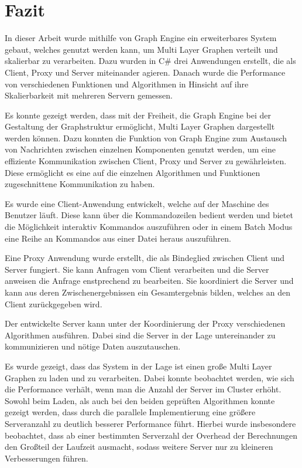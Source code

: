 \chapter{Fazit}

In dieser Arbeit wurde mithilfe von Graph Engine ein erweiterbares System gebaut, welches genutzt werden kann, um Multi Layer Graphen verteilt und skalierbar zu verarbeiten.
Dazu wurden in C\# drei Anwendungen erstellt, die als Client, Proxy und Server miteinander agieren.
Danach wurde die Performance von verschiedenen Funktionen und Algorithmen in Hinsicht auf ihre Skalierbarkeit mit mehreren Servern gemessen.


Es konnte gezeigt werden, dass mit der Freiheit, die Graph Engine bei der Gestaltung der Graphstruktur ermöglicht, Multi Layer Graphen dargestellt werden können.
Dazu konnten die Funktion von Graph Engine zum Austausch von Nachrichten zwischen einzelnen Komponenten genutzt werden, um eine effiziente Kommunikation zwischen Client, Proxy und Server zu gewährleisten. 
Diese ermöglicht es eine auf die einzelnen Algorithmen und Funktionen zugeschnittene Kommunikation zu haben.


Es wurde eine Client-Anwendung entwickelt, welche auf der Maschine des Benutzer läuft. Diese kann über die Kommandozeilen bedient werden und bietet die Möglichkeit interaktiv Kommandos auszuführen oder in einem Batch Modus eine Reihe an Kommandos aus einer Datei heraus auszuführen.

Eine Proxy Anwendung wurde erstellt, die als Bindeglied zwischen Client und Server fungiert. Sie kann Anfragen vom Client verarbeiten und die Server anweisen die Anfrage enstprechend zu bearbeiten. Sie koordiniert die Server und kann aus deren Zwischenergebnissen ein Gesamtergebnis bilden, welches an den Client zurückgegeben wird.

Der entwickelte Server kann unter der Koordinierung der Proxy verschiedenen Algorithmen ausführen. Dabei sind die Server in der Lage untereinander zu kommunizieren und nötige Daten auszutauschen.


Es wurde gezeigt, dass das System in der Lage ist einen große Multi Layer Graphen zu laden und zu verarbeiten. Dabei konnte beobachtet werden, wie sich die Performance verhält, wenn man die Anzahl der Server im Cluster erhöht.
Sowohl beim Laden, als auch bei den beiden geprüften Algorithmen konnte gezeigt werden, dass durch die parallele Implementierung eine größere Serveranzahl zu deutlich besserer Performance führt.
Hierbei wurde insbesondere beobachtet, dass ab einer bestimmten Serverzahl der Overhead der Berechnungen den Großteil der Laufzeit ausmacht, sodass weitere Server nur zu kleineren Verbesserungen führen.


